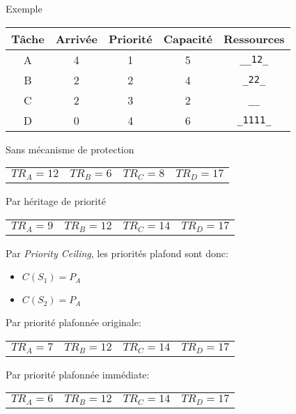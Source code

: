 \begin{frame}{Exemple}
  \begin{center}
    \begin{tabular}{ccccc}
      \hline
      Tâche & Arrivée & Priorité & Capacité & Ressources \\
      \hline
      A & 4 & 1 & 5 & \texttt{\_\_12\_}\\
      B & 2 & 2 & 4 & \texttt{\_22\_}\\
      C & 2 & 3 & 2 & \texttt{\_\_}\\
      D & 0 & 4 & 6 & \texttt{\_1111\_}\\
      \hline
    \end{tabular}
  \end{center}
  \begin{overprint}

    Sans mécanisme de protection
    \begin{center}
      
      \begin{tabular}{cccc}
        $TR_A = 12$ & $TR_B = 6$ & $TR_C = 8$ & $TR_D = 17$\\
      \end{tabular}
    \end{center}
    
    Par héritage de priorité
    \begin{center}
      
      \begin{tabular}{cccc}
        $TR_A = 9$ & $TR_B = 12$ & $TR_C = 14$ & $TR_D = 17$\\
      \end{tabular}
    \end{center}

    Par \emph{Priority Ceiling}, les priorités plafond sont donc: 
    \begin{itemize}
    \item $C(S_1) = P_A$ 
    \item $C(S_2) = P_A$ 
    \end{itemize}

    Par priorité plafonnée originale:
    \begin{center}
      
      \begin{tabular}{cccc}
        $TR_A = 7$ & $TR_B = 12$ & $TR_C = 14$ & $TR_D = 17$\\
      \end{tabular}
    \end{center}

    Par priorité plafonnée immédiate:
    \begin{center}
      
      \begin{tabular}{cccc}
        $TR_A = 6$ & $TR_B = 12$ & $TR_C = 14$ & $TR_D = 17$\\
      \end{tabular}
    \end{center}
  \end{overprint}
\end{frame} 

